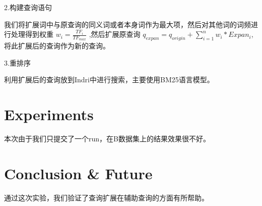 \documentclass[11pt]{article} %
\begin{document}
\begin{CJK}{UTF8}{gkai}
2.构建查询语句

我们将扩展词中与原查询的同义词或者本身词作为最大项，然后对其他词的词频进行处理得到权重 $w_i = \frac{TF_i}{TF_{max}}$ ,然后扩展原查询 $q_{expan} = q_{origin} + \sum^n_{i=1}w_i*Expan_i$, 将此扩展后的查询作为新的查询。

3.重排序

利用扩展后的查询放到Indri中进行搜索，主要使用BM25语言模型。


\section{Experiments}

本次由于我们只提交了一个run，在B数据集上的结果效果很不好。

\section{Conclusion & Future}

通过这次实验，我们验证了查询扩展在辅助查询的方面有所帮助。






\end{CJK}
\end{document}
